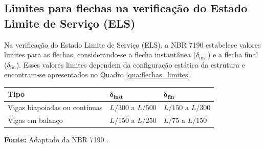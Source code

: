 

\subsection{Limites para flechas na verificação do Estado Limite de Serviço (ELS)}

Na verificação do Estado Limite de Serviço (ELS), a NBR 7190 \parencite{NBR7190-1:2022} estabelece valores limites para as flechas, considerando-se a flecha instantânea ($\delta_{\mathrm{inst}}$) e a flecha final ($\delta_{\mathrm{fin}}$). Esses valores limites dependem da configuração estática da estrutura e encontram-se apresentados no Quadro \ref{qua:flechas_limites}.

\begin{quadro}[htpb!]
    \centering
    \renewcommand{\tablename}{Quadro}
    
    \caption{Flechas limites para elementos correntes fletidos.}
    \label{qua:flechas_limites}

    \fontsize{11pt}{13.2pt}\selectfont
    \begin{tabular}{|>{\centering\arraybackslash}m{5.0cm}|>{\centering\arraybackslash}m{3.5cm}|>{\centering\arraybackslash}m{3.5cm}|}
        \hline
        \textbf{Tipo} & $\boldsymbol{\delta_{inst}}$ & $\boldsymbol{\delta_{fin}}$ \\ \hline
        Vigas biapoiadas ou contínuas & $L/300$ a $L/500$ & $L/150$ a $L/300$ \\ \hline
        Vigas em balanço & $L/150$ a $L/250$ & $L/75$ a $L/150$ \\ \hline
    \end{tabular}

    \vspace{0.1cm}
    \par {\fontsize{11pt}{13.2pt}\selectfont \textbf{Fonte:} Adaptado da NBR 7190 \parencite{NBR7190-1:2022}.}
\end{quadro}






